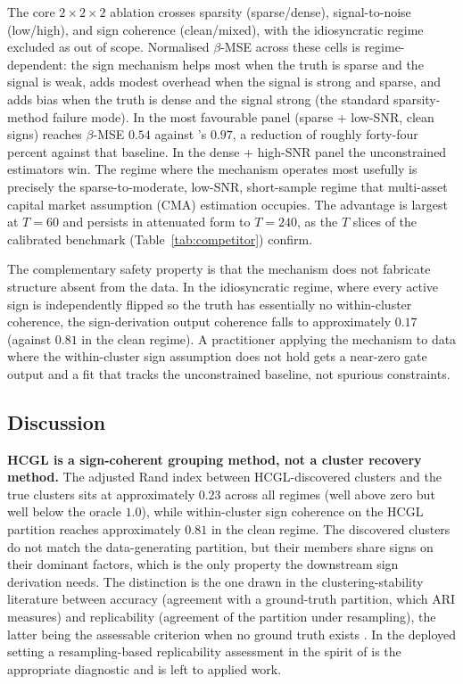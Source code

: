 \documentclass[article]{jss}
\begin{document}
The core $2 \times 2 \times 2$ ablation crosses sparsity (sparse/dense),
signal-to-noise (low/high), and sign coherence (clean/mixed), with the
idiosyncratic regime excluded as out of scope. Normalised $\beta$-MSE
across these cells is regime-dependent: the sign mechanism helps most
when the truth is sparse and the signal is weak, adds modest overhead
when the signal is strong and sparse, and adds bias when the truth is
dense and the signal strong (the standard sparsity-method failure mode).
In the most favourable panel (sparse + low-SNR, clean signs)
 reaches $\beta$-MSE $0.54$ against 's
$0.97$, a reduction of roughly forty-four percent against that baseline.
In the dense + high-SNR panel the unconstrained estimators win. The
regime where the mechanism operates most usefully is precisely the
sparse-to-moderate, low-SNR, short-sample regime that multi-asset capital
market assumption (CMA) estimation occupies. The advantage is largest at
$T = 60$ and persists in attenuated form to $T = 240$, as the $T$ slices
of the calibrated benchmark (Table~\ref{tab:competitor}) confirm.

The complementary safety property is that the mechanism does not fabricate
structure absent from the data. In the idiosyncratic regime, where every
active sign is independently flipped so the truth has essentially no
within-cluster coherence, the sign-derivation output coherence falls to
approximately $0.17$ (against $0.81$ in the clean regime). A practitioner
applying the mechanism to data where the within-cluster sign assumption
does not hold gets a near-zero gate output and a fit that tracks the
unconstrained baseline, not spurious constraints.


\subsection[Discussion]{Discussion} \label{sec:sim-discussion}

\textbf{HCGL is a sign-coherent grouping method, not a cluster recovery
method.} The
adjusted Rand index between HCGL-discovered clusters and the true
clusters sits at approximately $0.23$ across all regimes (well above
zero but well below the oracle $1.0$), while within-cluster sign
coherence on the HCGL partition reaches approximately $0.81$ in the
clean regime. The discovered clusters do not match the data-generating
partition, but their members share signs on their dominant factors,
which is the only property the downstream sign derivation needs. The
distinction is the one drawn in the clustering-stability literature
between accuracy (agreement with a ground-truth partition, which ARI
measures) and replicability (agreement of the partition under
resampling), the latter being the assessable criterion when no ground
truth exists \citep{vonLuxburg:2010}. In the deployed
setting a resampling-based replicability assessment in the spirit of
\citet{Sorooshyari+Rivas+Tibshirani:2026} is the appropriate diagnostic
and is left to applied work.
\end{document}
